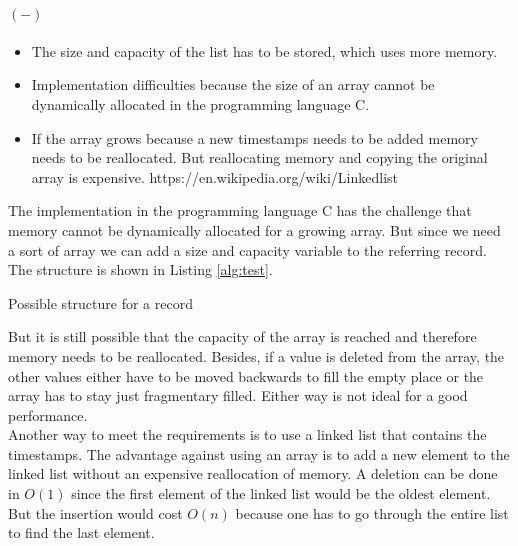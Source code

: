 \documentclass[abstracton,12pt]{scrreprt}
\begin{document}
\paragraph{$(-)$}
\begin{itemize}  
	\item The size and capacity of the list has to be stored, which uses more memory. 
	\item Implementation difficulties because the size of an array cannot be dynamically allocated in the programming language C.
	\item If the array grows because a new timestamps needs to be added memory needs to be reallocated. But reallocating memory and copying the original array is expensive. https://en.wikipedia.org/wiki/Linkedlist\\
\end{itemize}
The implementation in the programming language C has the challenge that memory cannot be dynamically allocated for a growing array. But since we need a sort of array we can add a size and capacity variable to the referring record. The structure is shown in Listing \ref{alg:test}.
\begin{algorithm}[H]

\caption{Possible structure for a record}
\end{algorithm}
But it is still possible that the capacity of the array is reached and therefore memory needs to be reallocated. Besides, if a value is deleted from the array, the other values either have to be moved backwards to fill the empty place or the array has to stay just fragmentary filled. Either way is not ideal for a good performance. \\
Another way to meet the requirements is to use a linked list that contains the timestamps. The advantage against using an array is to add a new element to the linked list without an expensive reallocation of memory. A deletion can be done in $O(1)$ since the first element of the linked list would be the oldest element. But the insertion would cost $O(n)$ because one has to go through the entire list to find the last element. \\
\end{document}
